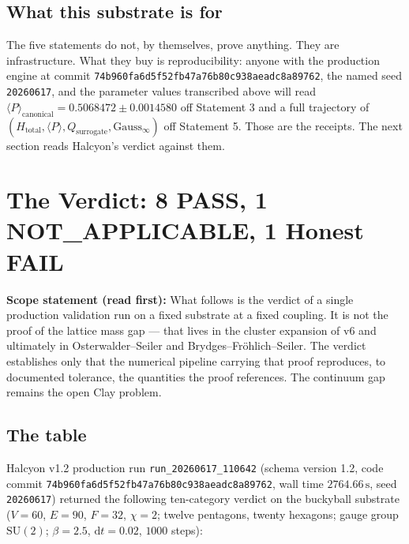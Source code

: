\documentclass[12pt,a4paper]{article}
\theoremstyle{plain}
\theoremstyle{definition}
\theoremstyle{remark}
\begin{document}
\subsection{What this substrate is for}

The five statements do not, by themselves, prove anything. They are infrastructure. What they buy is reproducibility: anyone with the production engine at commit \texttt{74b960fa6d5f52fb47a76b80c938aeadc8a89762}, the named seed \texttt{20260617}, and the parameter values transcribed above will read $\langle P \rangle_{\mathrm{canonical}} = 0.5068472 \pm 0.0014580$ off Statement 3 and a full trajectory of $(H_{\mathrm{total}}, \langle P \rangle, Q_{\mathrm{surrogate}}, \mathrm{Gauss}_\infty)$ off Statement 5. Those are the receipts. The next section reads Halcyon's verdict against them.

\section{The Verdict: 8 PASS, 1 NOT\_APPLICABLE, 1 Honest FAIL}
\label{sec:verdict}

\textbf{Scope statement (read first):} What follows is the verdict of a single production validation run on a fixed substrate at a fixed coupling. It is not the proof of the lattice mass gap --- that lives in the cluster expansion of v6 and ultimately in Osterwalder--Seiler and Brydges--Fr\"ohlich--Seiler. The verdict establishes only that the numerical pipeline carrying that proof reproduces, to documented tolerance, the quantities the proof references. The continuum gap remains the open Clay problem.

\subsection{The table}
\label{subsec:table}

Halcyon v1.2 production run \texttt{run\_20260617\_110642} (schema version 1.2, code commit \texttt{74b960fa6d5f52fb47a76b80c938aeadc8a89762}, wall time $2764.66\,\mathrm{s}$, seed \texttt{20260617}) returned the following ten-category verdict on the buckyball substrate ($V=60$, $E=90$, $F=32$, $\chi=2$; twelve pentagons, twenty hexagons; gauge group $\mathrm{SU}(2)$; $\beta=2.5$, $\mathrm{d}t=0.02$, $1000$ steps):
\end{document}

